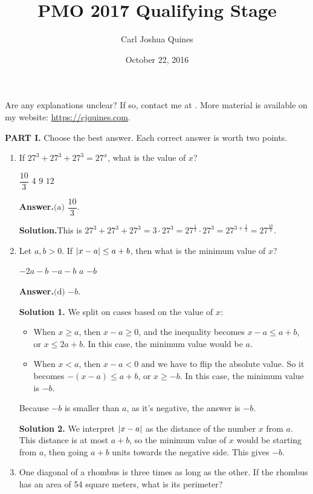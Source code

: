 \documentclass[11pt,paper=letter]{scrartcl}
\newcommand{\ans}{{\sffamily \bfseries Answer.}\;}
\newcommand{\ansb}[2]{\ans\(\boxed{\text{(#1) #2}}\).}
\newcommand{\sol}{{\sffamily \bfseries Solution.}\;}
\newcommand{\soln}[1]{{\sffamily \bfseries Solution #1.}\;}
\begin{document}
\title{PMO 2017 Qualifying Stage}
\author{Carl Joshua Quines}
\date{October 22, 2016}

\maketitle

Are any explanations unclear? If so, contact me at . More material is available on my website: \url{https://cjquines.com}.

\textbf{PART I.} Choose the best answer. Each correct answer is worth two points.

\begin{enumerate}[left=0pt]

\item If $27^3 + 27^3 + 27^3 = 27^x$, what is the value of $x$?

\fourch
{$\dfrac{10}{3}$}
{$4$}
{$9$}
{$12$}

\ansb{a}{$\dfrac{10}{3}$}

\sol This is $27^3 + 27^3 + 27^3 = 3 \cdot 27^3 = 27^{\frac{1}{3}} \cdot 27^3 = 27^{3 + \frac{1}{3}} = 27^{\frac{10}{3}}.$

\item Let $a, b > 0$. If $\left\lvert x - a \right\rvert \le a + b$, then what is the minimum value of $x$?

\fourch
{$-2a-b$}
{$-a-b$}
{$a$}
{$-b$}

\ansb{d}{$-b$}

\soln1 We split on cases based on the value of $x$:

\begin{itemize}
\item When $x \ge a$, then $x - a \ge 0$, and the inequality becomes $x - a \le a + b$, or $x \le 2a + b$. In this case, the minimum value would be $a$.
\item When $x < a$, then $x - a < 0$ and we have to flip the absolute value. So it becomes $-(x - a) \le a + b$, or $x \ge -b$. In this case, the minimum value is $-b$.
\end{itemize}

Because $-b$ is smaller than $a$, as it's negative, the answer is $-b$.

\soln2 We interpret $\left\lvert x - a \right\rvert$ as the distance of the number $x$ from $a$. This distance is at most $a + b$, so the minimum value of $x$ would be starting from $a$, then going $a + b$ units towards the negative side. This gives $-b$.

\item One diagonal of a rhombus is three times as long as the other. If the rhombus has an area of 54 square meters, what is its perimeter?


\end{enumerate}
\end{document}
